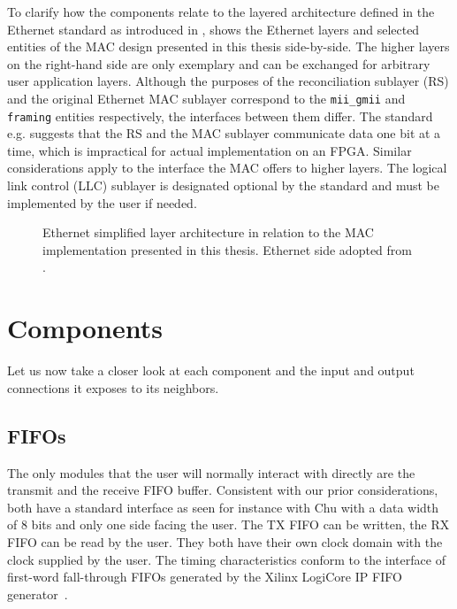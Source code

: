 \documentclass[a4paper, 11pt, oneside]{Thesis}  %
\begin{document}
To clarify how the components relate to the layered architecture defined in the Ethernet standard as introduced in ,  shows the Ethernet layers and selected entities of the MAC design presented in this thesis side-by-side. The higher layers on the right-hand side are only exemplary and can be exchanged for arbitrary user application layers. Although the purposes of the reconciliation sublayer (RS) and the original Ethernet MAC sublayer correspond to the \texttt{mii\_gmii} and \texttt{framing} entities respectively, the interfaces between them differ. The standard e.g. suggests that the RS and the MAC sublayer communicate data one bit at a time, which is impractical for actual implementation on an FPGA. Similar considerations apply to the interface the MAC offers to higher layers. The logical link control (LLC) sublayer is designated optional by the standard and must be implemented by the user if needed.

\begin{figure}
\centering

\caption[Ethernet simplified layer architecture in relation to the MAC implementation presented in this thesis]{Ethernet simplified layer architecture in relation to the MAC implementation presented in this thesis. Ethernet side adopted from \cite[fig. 1-1]{Ethernet}.}
\label{fig:mac_layers}
\end{figure}

\section{Components}\label{ch:components}

Let us now take a closer look at each component and the input and output connections it exposes to its neighbors.

\subsection{FIFOs}\label{ch:design_fifos}

The only modules that the user will normally interact with directly are the transmit and the receive FIFO buffer. Consistent with our prior considerations, both have a standard interface as seen for instance with Chu \cite[280]{RTLHardwareDesign} with a data width of 8 bits and only one side facing the user. The TX FIFO can be written, the RX FIFO can be read by the user. They both have their own clock domain with the clock supplied by the user. The timing characteristics conform to the interface of first-word fall-through FIFOs generated by the Xilinx LogiCore IP FIFO generator~\cite{XilinxFIFO}.
\end{document}
